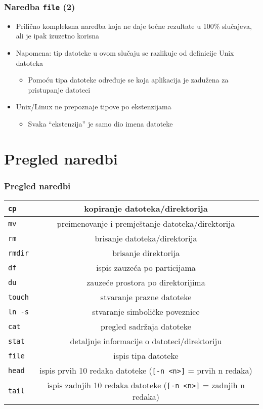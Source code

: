 \documentclass{beamer}
\newcommand{\shell}[1]{\texttt{\small #1}}
\begin{document}
\begin{frame}[t]
\frametitle{Naredba \shell{file} (2)}
\begin{itemize}
  \item Prilično kompleksna naredba koja ne daje točne rezultate u 100\%
        slučajeva, ali je ipak izuzetno korisna
  \item Napomena: tip datoteke u ovom slučaju se razlikuje od definicije
        Unix datoteka
  \begin{itemize}
    \item Pomoću tipa datoteke određuje se koja aplikacija je zadužena za
          pristupanje datoteci
  \end{itemize}
  \item Unix/Linux ne prepoznaje tipove po ekstenzijama
  \begin{itemize}
    \item Svaka ``ekstenzija'' je samo dio imena datoteke
  \end{itemize}
\end{itemize}
\end{frame}

\section{Pregled naredbi}
\begin{frame}[t]
\frametitle{Pregled naredbi}
\begin{tabular}{| l | c |} \hline
  \shell{cp} & kopiranje datoteka/direktorija \\ \hline
  \shell{mv} & preimenovanje i premještanje datoteka/direktorija \\ \hline
  \shell{rm} & brisanje datoteka/direktorija \\ \hline
  \shell{rmdir} & brisanje direktorija \\ \hline
  \shell{df} & ispis zauzeća po particijama \\ \hline
  \shell{du} & zauzeće prostora po direktorijima \\ \hline
  \shell{touch} & stvaranje prazne datoteke \\ \hline
  \shell{ln -s} & stvaranje simboličke poveznice \\ \hline
  \shell{cat} & pregled sadržaja datoteke \\ \hline
  \shell{stat} & detaljnje informacije o datoteci/direktoriju \\ \hline
  \shell{file} & ispis tipa datoteke \\ \hline
  \shell{head} & ispis prvih 10 redaka datoteke (\shell{[-n <n>]} = prvih n redaka) \\ \hline
  \shell{tail} & ispis zadnjih 10 redaka datoteke (\shell{[-n <n>]} = zadnjih n redaka) \\ \hline


\end{tabular}
\end{frame}
\end{document}
